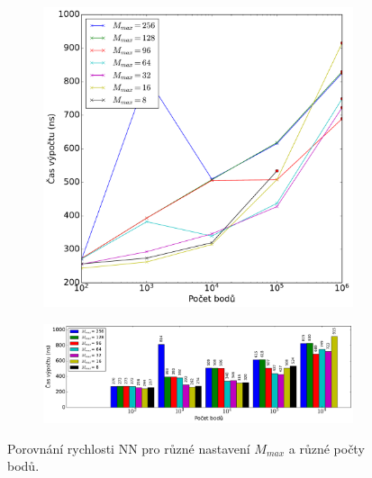 \begin{figure}
 
\begin{subfigure}[t]{1\columnwidth}
    \centering  
    \includegraphics[scale=0.45]{obrazky-figures/benchmark/nn/benchmark_nn_points_Mmax.pdf}

\end{subfigure}

\begin{subfigure}[t]{1\columnwidth}
    \centering  
    \includegraphics[scale=0.40]{obrazky-figures/benchmark/nn/benchmark_nnspeed_points_Mmax_bar.pdf}

\end{subfigure}
    \caption{Porovnání rychlosti NN pro různé nastavení $M_{max}$ a různé počty bodů. }
\label{fig:nn_benchmark}



\end{figure}

